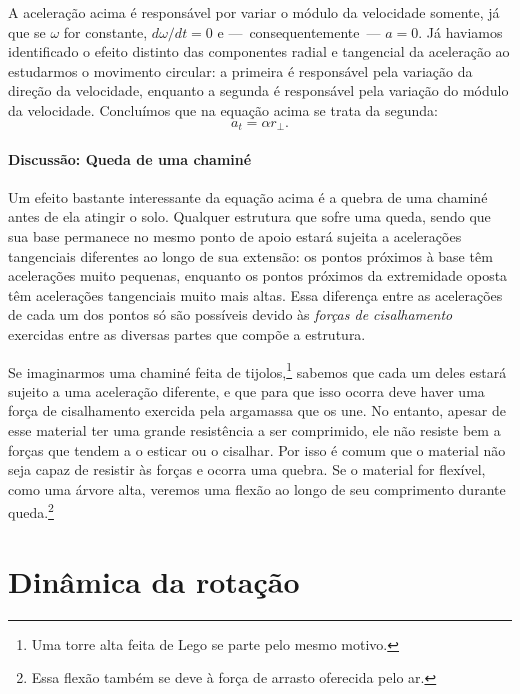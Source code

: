 A aceleração acima é responsável por variar o módulo da velocidade somente, já que se $\omega$ for constante, $d\omega/dt = 0$ e ---~consequentemente~--- $a=0$. Já haviamos identificado o efeito distinto das componentes radial e tangencial da aceleração ao estudarmos o movimento circular: a primeira é responsável pela variação da direção da velocidade, enquanto a segunda é responsável pela variação do módulo da velocidade. Concluímos que na equação acima se trata da segunda:
\begin{equation}
	a_t = \alpha r_\perp.
\end{equation}

\paragraph{Discussão: Queda de uma chaminé}

Um efeito bastante interessante da equação acima é a quebra de uma chaminé antes de ela atingir o solo. Qualquer estrutura que sofre uma queda, sendo que sua base permanece no mesmo ponto de apoio estará sujeita a acelerações tangenciais diferentes ao longo de sua extensão: os pontos próximos à base têm acelerações muito pequenas, enquanto os pontos próximos da extremidade oposta têm acelerações tangenciais muito mais altas. Essa diferença entre as acelerações de cada um dos pontos só são possíveis devido às \emph{forças de cisalhamento} exercidas entre as diversas partes que compõe a estrutura.

Se imaginarmos uma chaminé feita de tijolos,\footnote{Uma torre alta feita de Lego se parte pelo mesmo motivo.} sabemos que cada um deles estará sujeito a uma aceleração diferente, e que para que isso ocorra deve haver uma força de cisalhamento exercida pela argamassa que os une. No entanto, apesar de esse material ter uma grande resistência a ser comprimido, ele não resiste bem a forças que tendem a o esticar ou o cisalhar. Por isso é comum que o material não seja capaz de resistir às forças e ocorra uma quebra. Se o material for flexível, como uma árvore alta, veremos uma flexão ao longo de seu comprimento durante queda.\footnote{Essa flexão também se deve à força de arrasto oferecida pelo ar.}

\section{Dinâmica da rotação}

